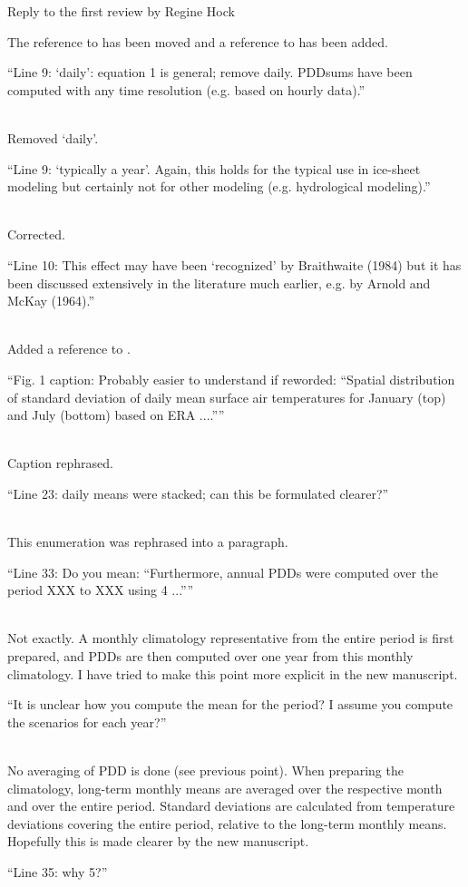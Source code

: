 \documentclass{letter}
\newcommand{\rev}[0]{\color{blue!50!black}\it}
\newcommand{\revpoint}[1]{{\rev\item``#1''}\\}
\begin{document}
\begin{letter}{Reply to the first review by Regine Hock}
\begin{enumerate}[resume]
    The reference to \citet{braithwaite-1984} has been moved and a reference to \citet{hock-2003} has been added.

    \revpoint{Line 9: ‘daily’: equation 1 is general; remove daily. PDDsums have been computed with any time resolution (e.g. based on hourly data).}

    Removed `daily'.

    \revpoint{Line 9: ‘typically a year’. Again, this holds for the typical use in ice-sheet modeling but certainly not for other modeling (e.g. hydrological modeling).}

    Corrected.

    \revpoint{Line 10: This effect may have been ‘recognized’ by Braithwaite (1984) but it has been discussed extensively in the literature much earlier, e.g. by Arnold and McKay (1964).}

    Added a reference to \citet{arnold-mackay-1964}.

    \revpoint{Fig. 1 caption: Probably easier to understand if reworded: “Spatial distribution of standard deviation of daily mean surface air temperatures for January (top) and July (bottom) based on ERA ....”}

    Caption rephrased.

    \revpoint{Line 23: daily means were stacked; can this be formulated clearer?}

    This enumeration was rephrased into a paragraph.

    \revpoint{Line 33: Do you mean: “Furthermore, annual PDDs were computed over the period XXX to XXX using 4 ...”}

    Not exactly. A monthly climatology representative from the entire period is first prepared, and PDDs are then computed over one year from this monthly climatology. I have tried to make this point more explicit in the new manuscript.

    \revpoint{It is unclear how you compute the mean for the period? I assume you compute the scenarios for each year?}

    No averaging of PDD is done (see previous point). When preparing the climatology, long-term monthly means are averaged over the respective month and over the entire period. Standard deviations are calculated from temperature deviations covering the entire period, relative to the long-term monthly means. Hopefully this is made clearer by the new manuscript.

    \revpoint{Line 35: why 5?}


\end{enumerate}
\end{letter}
\end{document}
